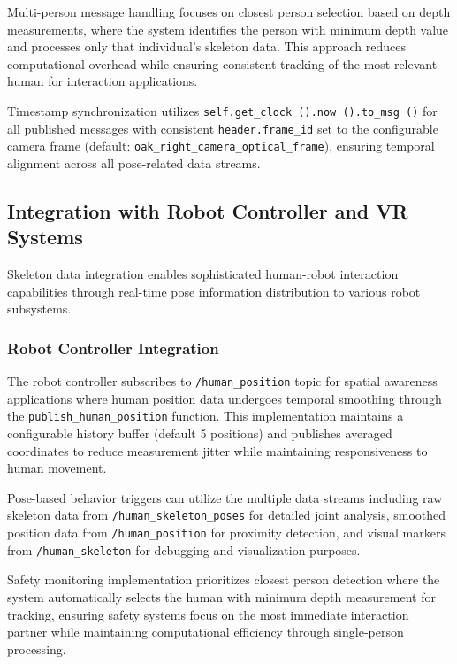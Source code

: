 Multi-person message handling focuses on closest person selection based on depth measurements, where the system identifies the person with minimum depth value and processes only that individual's skeleton data. This approach reduces computational overhead while ensuring consistent tracking of the most relevant human for interaction applications.

Timestamp synchronization utilizes \texttt{self.get\_clock ().now ().to\_msg ()} for all published messages with consistent \texttt{header.frame\_id} set to the configurable camera frame (default: \texttt{oak\_right\_camera\_optical\_frame}), ensuring temporal alignment across all pose-related data streams.

\subsection{Integration with Robot Controller and VR Systems}

Skeleton data integration enables sophisticated human-robot interaction capabilities through real-time pose information distribution to various robot subsystems.

\subsubsection{Robot Controller Integration}

The robot controller subscribes to \texttt{/human\_position} topic for spatial awareness applications where human position data undergoes temporal smoothing through the \texttt{publish\_human\_position} function. This implementation maintains a configurable history buffer (default 5 positions) and publishes averaged coordinates to reduce measurement jitter while maintaining responsiveness to human movement.

Pose-based behavior triggers can utilize the multiple data streams including raw skeleton data from \texttt{/human\_skeleton\_poses} for detailed joint analysis, smoothed position data from \texttt{/human\_position} for proximity detection, and visual markers from \texttt{/human\_skeleton} for debugging and visualization purposes.

Safety monitoring implementation prioritizes closest person detection where the system automatically selects the human with minimum depth measurement for tracking, ensuring safety systems focus on the most immediate interaction partner while maintaining computational efficiency through single-person processing.

